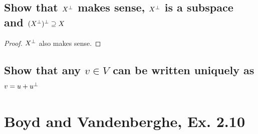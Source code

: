 \documentclass[11pt,a4paper]{article}
\begin{document}
\newpage
\subsection{Show that $X^{\perp}$ makes sense, $X^{\perp}$ is a subspace and
    $(X^{\perp})^{\perp} \supseteq X$}
\begin{proof}
    $X^{\perp}$ also makes sense. 
\end{proof}

\subsection{Show that any $v \in V$ can be written uniquely as $v = u + u^{\perp}$} 

\newpage
\section{Boyd and Vandenberghe, Ex. 2.10}
\newcommand{\Snp}{\ensuremath{\mathbb{S}_{+}^{n}}}
\newcommand{\x}[1]{\ensuremath{\mathbf{x}_{#1}}}
\newcommand{\linear}[1]{\ensuremath{b^T #1}}
\newcommand{\quadratic}[1]{\ensuremath{#1^{T} A #1}}
\newcommand{\nsquadratic}[2]{\ensuremath{#1^{T} A #2}}
\newcommand{\quacombo}[1]{\ensuremath{\quadratic{#1} + \linear{#1} + c}}
\newcommand{\xcombo}{\ensuremath{\lambda \x{1} + (1-\lambda) \x{2}}}
\end{document}
